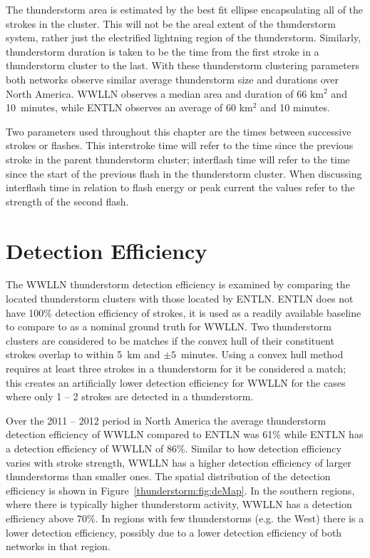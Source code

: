 The thunderstorm area is estimated by the best fit ellipse encapsulating all of the strokes in the cluster.
This will not be the areal extent of the thunderstorm system, rather just the electrified lightning region of the thunderstorm.
Similarly, thunderstorm duration is taken to be the time from the first stroke in a thunderstorm cluster to the last.
With these thunderstorm clustering parameters both networks observe similar average thunderstorm size and durations over North America.
WWLLN observes a median area and duration of 66 km$^2$ and 10~minutes, while ENTLN observes an average of 60 km$^2$ and 10 minutes.

Two parameters used throughout this chapter are the times between successive strokes or flashes.
This interstroke time will refer to the time since the previous stroke in the parent thunderstorm cluster; interflash time will refer to the time since the start of the previous flash in the thunderstorm cluster.
When discussing interflash time in relation to flash energy or peak current the values refer to the strength of the second flash.

\section{Detection Efficiency}

The WWLLN thunderstorm detection efficiency is examined by comparing the located thunderstorm clusters with those located by ENTLN.
ENTLN does not have 100\% detection efficiency of strokes, it is used as a readily available baseline to compare to as a nominal ground truth for WWLLN.
Two thunderstorm clusters are considered to be matches if the convex hull of their constituent strokes overlap to within 5~km and $\pm5$~minutes.
Using a convex hull method requires at least three strokes in a thunderstorm for it be considered a match; this creates an artificially lower detection efficiency for WWLLN for the cases where only 1 -- 2 strokes are detected in a thunderstorm.

Over the 2011 -- 2012 period in North America the average thunderstorm detection efficiency of WWLLN compared to ENTLN was 61\% while ENTLN has a detection efficiency of WWLLN of 86\%.
Similar to how detection efficiency varies with stroke strength, WWLLN has a higher detection efficiency of larger thunderstorms than smaller ones.
The spatial distribution of the detection efficiency is shown in Figure~\ref{thunderstorm:fig:deMap}.
In the southern regions, where there is typically higher thunderstorm activity, WWLLN has a detection efficiency above 70\%.
In regions with few thunderstorms (e.g. the West) there is a lower detection efficiency, possibly due to a lower detection efficiency of both networks in that region.

